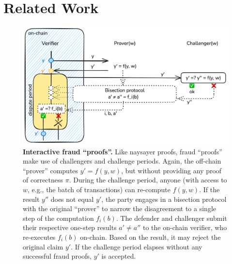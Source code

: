 \section{Related Work}
\label{sec:naysayer_related}

 \begin{figure}[tb]
    \includegraphics[width=\textwidth]{naysayer/figs/fraud-interactive.png}
    \caption{\textbf{Interactive fraud ``proofs''.} Like naysayer proofs, fraud ``proofs'' make use of challengers and challenge periods. Again, the off-chain ``prover'' computes $y' = f(y, w)$, but without providing any proof of correctness $\pi$. During the challenge period, anyone (with access to $w$, e.g., the batch of transactions) can re-compute $f(y, w)$. If the result $y''$ does not equal $y'$, the party engages in a bisection protocol with the original ``prover'' to narrow the disagreement to a single step of the computation $f_i(b)$. The defender and challenger submit their respective one-step results $a' \neq a''$ to the on-chain verifier, who re-executes $f_i(b)$ on-chain. Based on the result, it may reject the original claim $y'$. If the challenge period elapses without any successful fraud proofs, $y'$ is accepted.}
    \label{fig:fraud-interactive}
 \end{figure}


